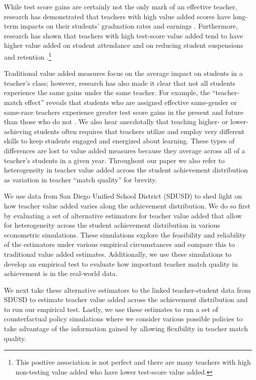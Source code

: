 \documentclass[letterpaper,12pt]{article}
\begin{document}
While test score gains are certainly not the only mark of an effective teacher, research has demonstrated that teachers with high value added scores have long-term impacts on their students' graduation rates and earnings \citep{chetty2014measuring2}. Furthermore, research has shown that teachers with high test-score value added tend to have higher value added on student attendance and on reducing student suspensions and retention \citep{pope2017multidimensional}.\footnote{This positive association is not perfect and there are many teachers with high non-testing value added who have lower test-score value added.} 

Traditional value added measures focus on the average impact on students in a teacher's class; however, research has also made it clear that not all students experience the same gains under the same teacher. For example, the ``teacher-match effect'' reveals that students who are assigned effective same-gender or same-race teachers experience greater test score gains in the present and future than those who do not \citep{dee2005teacher,delhommer2019highschool}. We also hear anecdotally that teaching higher- or lower-achieving students often requires that teachers utilize and employ very different skills to keep students engaged and energized about learning. These types of differences are lost to value added measures because they average across all of a teacher's students in a given year. Throughout our paper we also refer to heterogeneity in teacher value added across the student achievement distribution as variation in teacher ``match quality'' for brevity.

We use data from San Diego Unified School District (SDUSD) to shed light on how teacher value added varies along the achievement distribution. We do so first by evaluating a set of alternative estimators for teacher value added that allow for heterogeneity across the student achievement distribution in various econometric simulations. These simulations explore the feasibility and reliability of the estimators under various empirical circumstances and compare this to traditional value added estimates. Additionally, we use these simulations to develop an empirical test to evaluate how important teacher match quality in achievement is in the real-world data.

We next take these alternative estimators to the linked teacher-student data from SDUSD to estimate teacher value added across the achievement distribution and to run our empirical test. Lastly, we use these estimates to run a set of counterfactual policy simulations where we consider various possible policies to take advantage of the information gained by allowing flexibility in teacher match quality.
\end{document}
